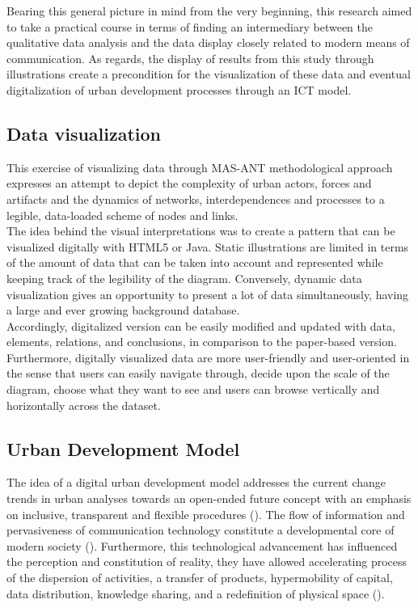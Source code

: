 \documentclass[11pt]{report}
\begin{document}
{Bearing this general picture in mind from the very beginning, this research aimed to take a practical course in terms of finding an intermediary between the qualitative data analysis and the data display closely related to modern means of communication.
As regards, the display of results from this study through illustrations create a precondition for the visualization of these data and eventual digitalization of urban development processes through an ICT model.

\subsection{Data visualization}

This exercise of visualizing data through MAS-ANT methodological approach expresses an attempt to depict the complexity of urban actors, forces and artifacts and the dynamics of networks, interdependences and processes to a legible, data-loaded scheme of nodes and links. 
\\

The idea behind the visual interpretations was to create a pattern that can be visualized digitally with HTML5 or Java.
Static illustrations are limited in terms of the amount of data that can be taken into account and represented while keeping track of the legibility of the diagram.
Conversely, dynamic data visualization gives an opportunity to present a lot of data simultaneously, having a large and ever growing background database. 
\\

Accordingly, digitalized version can be easily modified and updated with data, elements, relations, and conclusions, in comparison to the paper-based version.
Furthermore, digitally visualized data are more user-friendly and user-oriented in the sense that users can easily navigate through, decide upon the scale of the diagram, choose what they want to see and users can browse vertically and horizontally across the dataset.

\subsection{Urban Development Model}

The idea of a digital urban development model addresses the current change trends in urban analyses towards an open-ended future concept with an emphasis on inclusive, transparent and flexible procedures (\href{Rode}{\citealt{rode_city_2006}}).
The flow of information and pervasiveness of communication technology constitute a developmental core of modern society (\href{ref}{\citealt{sassen_cities_2012}}).
Furthermore, this technological advancement has influenced the perception and constitution of reality, they have allowed accelerating process of the dispersion of activities, a transfer of products, hypermobility of capital, data distribution, knowledge sharing, and a redefinition of physical space (\href{ref}{\citealt{firmino_pervasive_2008}}). 
\\

}
\end{document}
